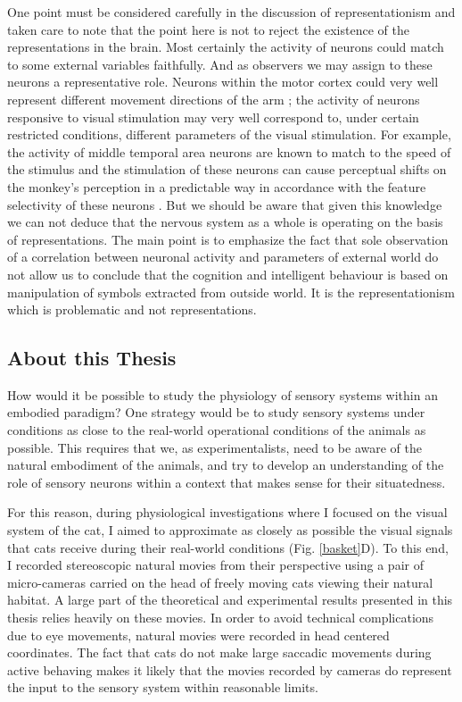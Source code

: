 One point must be considered carefully in the discussion of
representationism and taken care to note that the point here is not to
reject the existence of the representations in the brain. Most certainly
the activity of neurons could match to some external variables faithfully.
And as observers we may assign to these neurons a representative role.
Neurons within the motor cortex could very well represent different
movement directions of the arm \citep{georgopoulos1994a}; the activity of
neurons responsive to visual stimulation may very well correspond to, under
certain restricted conditions, different parameters of the visual
stimulation.  For example, the activity of middle temporal area neurons are
known to match to the speed of the stimulus \citep{liu2006a} and the
stimulation of these neurons can cause perceptual shifts on the monkey's
perception in a predictable way in accordance with the feature selectivity
of these neurons \citep{celebrini1994a}. But we should be aware that given
this knowledge we can not deduce that the nervous system as a whole is
operating on the basis of representations. The main point is to emphasize
the fact that sole observation of a correlation between neuronal activity
and parameters of external world do not allow us to conclude that the
cognition and intelligent behaviour is based on manipulation of symbols
extracted from outside world. It is the representationism which is
problematic and not representations. 


\subsection{About this Thesis}


How would it be possible to study the physiology of sensory systems within
an embodied paradigm? One strategy would be to study sensory systems under
conditions as close to the real-world operational conditions of the animals
as possible. This requires that we, as experimentalists, need to be aware
of the natural embodiment of the animals, and try to develop an
understanding of the role of sensory neurons within a context that makes
sense for their situatedness. 


For this reason, during physiological investigations where I focused on the
visual system of the cat, I aimed to approximate as closely as possible the
visual signals that cats receive during their real-world conditions (Fig.
\ref{basket}D).  To this end, I recorded stereoscopic natural movies from
their perspective using a pair of micro-cameras carried on the head of
freely moving cats viewing their natural habitat. A large part of the
theoretical and experimental results presented in this thesis relies
heavily on these movies. In order to avoid technical complications due to
eye movements, natural movies were recorded in head centered coordinates.
The fact that cats do not make large saccadic movements during active
behaving \citep{einhauser2008a} makes it likely that the movies recorded by
cameras do represent the input to the sensory system within reasonable
limits.


